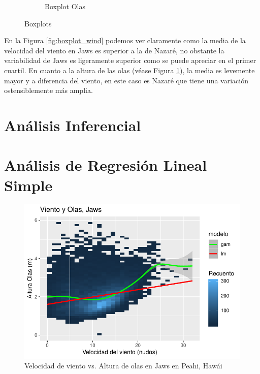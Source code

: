 \begin{figure}[H]
\begin{subfigure}{.49\textwidth}
        \caption{Boxplot Olas}
        \label{fig:boxplot_wave}
    \end{subfigure}
    \caption{Boxplots}
    \label{fig:boxplots}
\end{figure}

En la Figura \ref{fig:boxplot_wind} podemos ver claramente como la media de la velocidad del viento en Jaws es superior a la de Nazaré, no obstante la variabilidad de Jaws es ligeramente superior como se puede apreciar en el primer cuartil. En cuanto a la altura de las olas (véase Figura \ref{fig:boxplot_wave}), la media es levemente mayor y a diferencia del viento, en este caso es Nazaré que tiene una variación ostensiblemente más amplia.

\section{Análisis Inferencial}%
\label{sec:resultados}

\section{Análisis de Regresión Lineal Simple}
\label{sec:rls}

\begin{figure}[H]
    \centering
    \includegraphics{./figures/jaws_all.pdf}
    \caption{Velocidad de viento vs. Altura de olas en Jaws en Peahi, Hawái}
    \label{fig:wind_waves_jaws_all}
\end{figure}

